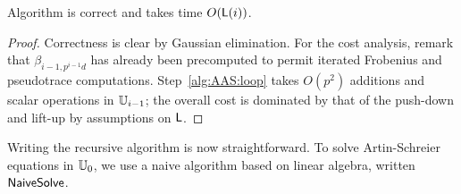 \begin{theorem}
  \label{th:approximateAS}
  Algorithm  is correct and takes time $O(\mathsf{L}(i))$.
\end{theorem}

\begin{proof}
  Correctness is clear by Gaussian elimination.  For the cost
  analysis, remark that $\beta_{i-1,p^{i-1}d}$ has already been
  precomputed to permit iterated Frobenius and pseudotrace
  computations. Step~\ref{alg:AAS:loop} takes $O(p^2)$ additions and
  scalar operations in $\mathbb{U}_{i-1}$; the overall cost is dominated by
  that of the push-down and lift-up by assumptions on $\mathsf{L}$.
\end{proof}



Writing the recursive algorithm is now straightforward. To solve
Artin-Schreier equations in $\mathbb{U}_0$, we use a naive algorithm based on
linear algebra, written ${\sf NaiveSolve}$.

